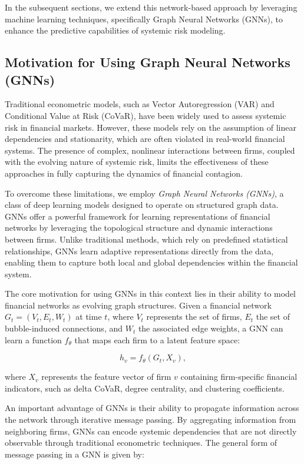 \documentclass[preprint,12pt,authoryear]{elsarticle}
\begin{document}
In the subsequent sections, we extend this network-based approach by leveraging machine learning techniques, specifically Graph Neural Networks (GNNs), to enhance the predictive capabilities of systemic risk modeling.


\subsection{Motivation for Using Graph Neural Networks (GNNs)}  

Traditional econometric models, such as Vector Autoregression (VAR) and Conditional Value at Risk (CoVaR), have been widely used to assess systemic risk in financial markets. However, these models rely on the assumption of linear dependencies and stationarity, which are often violated in real-world financial systems. The presence of complex, nonlinear interactions between firms, coupled with the evolving nature of systemic risk, limits the effectiveness of these approaches in fully capturing the dynamics of financial contagion.  

To overcome these limitations, we employ \textit{Graph Neural Networks (GNNs)}, a class of deep learning models designed to operate on structured graph data. GNNs offer a powerful framework for learning representations of financial networks by leveraging the topological structure and dynamic interactions between firms. Unlike traditional methods, which rely on predefined statistical relationships, GNNs learn adaptive representations directly from the data, enabling them to capture both local and global dependencies within the financial system.  

The core motivation for using GNNs in this context lies in their ability to model financial networks as evolving graph structures. Given a financial network \( G_t = (V_t, E_t, W_t) \) at time \( t \), where \( V_t \) represents the set of firms, \( E_t \) the set of bubble-induced connections, and \( W_t \) the associated edge weights, a GNN can learn a function \( f_{\theta} \) that maps each firm to a latent feature space:

\[
h_v = f_{\theta}(G_t, X_v),
\]

where \( X_v \) represents the feature vector of firm \( v \) containing firm-specific financial indicators, such as delta CoVaR, degree centrality, and clustering coefficients.  

An important advantage of GNNs is their ability to propagate information across the network through iterative message passing. By aggregating information from neighboring firms, GNNs can encode systemic dependencies that are not directly observable through traditional econometric techniques. The general form of message passing in a GNN is given by:
\end{document}
